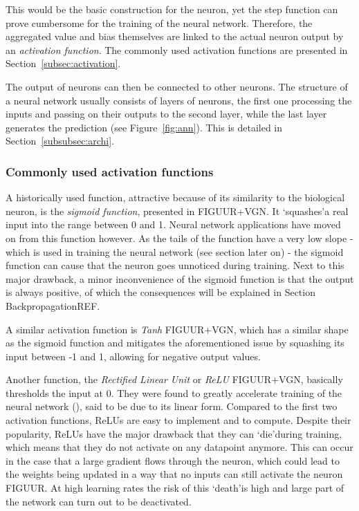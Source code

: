 This would be the basic construction for the neuron, yet the step function can prove cumbersome for the training of the neural network. Therefore, the aggregated value and bias themselves are linked to the actual neuron output by an \textit{activation function}. The commonly used activation functions are presented in Section~\ref{subsec:activation}. 


The output of neurons can then be connected to other neurons. The structure of a neural network usually consists of layers of neurons, the first one processing the inputs and passing on their outputs to the second layer, while the last layer generates the prediction (see Figure~\ref{fig:ann}). This is detailed in Section~\ref{subsubsec:archi}.


\subsubsection{Commonly used activation functions \label{subsec:activation}}
A historically used function, attractive because of its similarity to the biological neuron, is the \textit{sigmoid function}, presented in FIGUUR+VGN. It `squashes\textquoteright  a real input into the range between 0 and 1. Neural network applications have moved on from this function however. As the tails of the function have a very low slope - which is used in training the neural network (see section later on) -  the sigmoid function can cause that the neuron goes unnoticed during training. Next to this major drawback, a minor inconvenience of the sigmoid function is that the output is always positive, of which the consequences will be explained in Section BackpropagationREF.


A similar activation function is \textit{Tanh} FIGUUR+VGN, which has a similar shape as the sigmoid function and mitigates the aforementioned issue by squashing its input between -1 and 1, allowing for negative output values. 


Another function, the \textit{Rectified Linear Unit} or \textit{ReLU} FIGUUR+VGN, basically thresholds the input at 0. They were found to greatly accelerate training of the neural network (\cite{Krizhevsky2012}), said to be due to its linear form. Compared to the first two activation functions, ReLUs are easy to implement and to compute. Despite their popularity, ReLUs have the major drawback that they can \textquoteleft die\textquoteright  during training, which means that they do not activate on any datapoint anymore. This can occur in the case that a large gradient flows through the neuron, which could lead to the weights being updated in a way that no inputs can still activate the neuron FIGUUR. At high learning rates the risk of this \textquoteleft death\textquoteright  is high and large part of the network can turn out to be deactivated.


